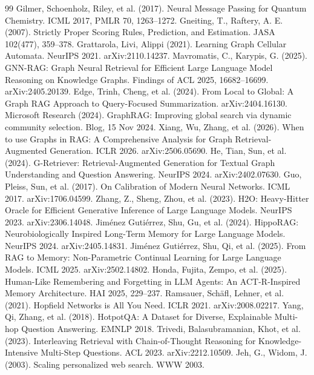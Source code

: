 \documentclass[11pt]{article}
\begin{document}
\begin{thebibliography}{99}
 Gilmer, Schoenholz, Riley, et al. (2017). Neural Message Passing for Quantum Chemistry. ICML 2017, PMLR 70, 1263--1272.
 Gneiting, T., Raftery, A. E. (2007). Strictly Proper Scoring Rules, Prediction, and Estimation. JASA 102(477), 359--378.
 Grattarola, Livi, Alippi (2021). Learning Graph Cellular Automata. NeurIPS 2021. arXiv:2110.14237.
 Mavromatis, C., Karypis, G. (2025). GNN-RAG: Graph Neural Retrieval for Efficient Large Language Model Reasoning on Knowledge Graphs. Findings of ACL 2025, 16682--16699. arXiv:2405.20139.
 Edge, Trinh, Cheng, et al. (2024). From Local to Global: A Graph RAG Approach to Query-Focused Summarization. arXiv:2404.16130.
 Microsoft Research (2024). GraphRAG: Improving global search via dynamic community selection. Blog, 15 Nov 2024.
 Xiang, Wu, Zhang, et al. (2026). When to use Graphs in RAG: A Comprehensive Analysis for Graph Retrieval-Augmented Generation. ICLR 2026. arXiv:2506.05690.
 He, Tian, Sun, et al. (2024). G-Retriever: Retrieval-Augmented Generation for Textual Graph Understanding and Question Answering. NeurIPS 2024. arXiv:2402.07630.
 Guo, Pleiss, Sun, et al. (2017). On Calibration of Modern Neural Networks. ICML 2017. arXiv:1706.04599.
 Zhang, Z., Sheng, Zhou, et al. (2023). H2O: Heavy-Hitter Oracle for Efficient Generative Inference of Large Language Models. NeurIPS 2023. arXiv:2306.14048.
 Jim{\'{e}}nez Guti{\'{e}}rrez, Shu, Gu, et al. (2024). HippoRAG: Neurobiologically Inspired Long-Term Memory for Large Language Models. NeurIPS 2024. arXiv:2405.14831.
 Jim{\'{e}}nez Guti{\'{e}}rrez, Shu, Qi, et al. (2025). From RAG to Memory: Non-Parametric Continual Learning for Large Language Models. ICML 2025. arXiv:2502.14802.
 Honda, Fujita, Zempo, et al. (2025). Human-Like Remembering and Forgetting in LLM Agents: An ACT-R-Inspired Memory Architecture. HAI 2025, 229--237.
 Ramsauer, Sch{\"{a}}fl, Lehner, et al. (2021). Hopfield Networks is All You Need. ICLR 2021. arXiv:2008.02217.
 Yang, Qi, Zhang, et al. (2018). HotpotQA: A Dataset for Diverse, Explainable Multi-hop Question Answering. EMNLP 2018.
 Trivedi, Balasubramanian, Khot, et al. (2023). Interleaving Retrieval with Chain-of-Thought Reasoning for Knowledge-Intensive Multi-Step Questions. ACL 2023. arXiv:2212.10509.
 Jeh, G., Widom, J. (2003). Scaling personalized web search. WWW 2003.

\end{thebibliography}
\end{document}

